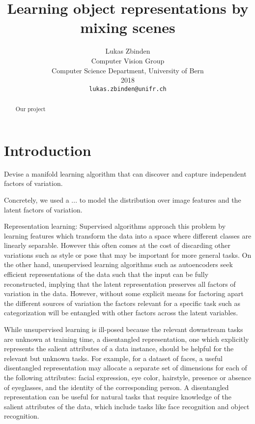 \documentclass[10pt,letterpaper]{article}
\begin{document}
\title{Learning object representations by mixing scenes}

\author{Lukas Zbinden\\
Computer Vision Group\\
Computer Science Department, University of Bern\\ 
2018\\
{\tt\small lukas.zbinden@unifr.ch}
}

\maketitle

\begin{abstract}
   Our project 
\end{abstract}

\section{Introduction}
Devise a manifold learning algorithm that can discover and capture independent factors of variation.

\par Concretely, we used a ... to model the distribution over image features and the latent factors of variation.

Representation learning: Supervised algorithms approach this problem by learning features which transform the data into a space where different
classes are linearly separable. However this often comes at the cost of discarding other variations such as style or pose that may be important for more general tasks. On the other hand, unsupervised learning algorithms such as autoencoders seek efficient representations of the data such that the input can be fully reconstructed, implying that the latent representation preserves all factors of variation in the data. However, without some explicit means for factoring apart the different sources of variation the factors relevant for a specific task such as categorization will be entangled with other factors across the latent variables. 

While unsupervised learning is ill-posed because the relevant downstream tasks are unknown at training time, a disentangled representation, one which explicitly represents the salient attributes of a data instance, should be helpful for the relevant but unknown tasks. For example, for a dataset of faces, a useful disentangled representation may allocate a separate set of dimensions for each of the following attributes: facial expression, eye color, hairstyle, presence or absence of eyeglasses, and the identity of the corresponding person. A disentangled representation can be useful for natural tasks that require knowledge of the salient attributes of the data, which include tasks like face recognition and object recognition.
\end{document}
